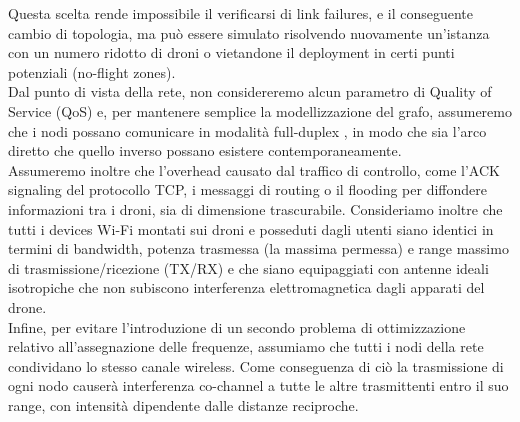 Questa scelta rende impossibile il verificarsi di link failures, e il conseguente cambio di topologia, ma può essere simulato risolvendo nuovamente un'istanza con un numero ridotto di droni o vietandone il deployment in certi punti potenziali (no-flight zones). \\
Dal punto di vista della rete, non considereremo alcun parametro di Quality of Service (QoS) \cite{6686488} e, per mantenere semplice la modellizzazione del grafo, assumeremo che i nodi possano comunicare in modalità full-duplex \cite{6262501}, in modo che sia l'arco diretto che quello inverso possano esistere contemporaneamente.  \\
Assumeremo inoltre che l'overhead causato dal traffico di controllo, come l'ACK signaling del protocollo TCP, i messaggi di routing o il flooding per diffondere informazioni tra i droni, sia di dimensione trascurabile. 
Consideriamo inoltre che tutti i devices Wi-Fi montati sui droni e posseduti dagli utenti siano identici in termini di bandwidth, potenza trasmessa (la massima permessa) e range massimo di trasmissione/ricezione (TX/RX) e che siano equipaggiati con antenne ideali isotropiche \cite{zennaro2004radio} che non subiscono interferenza elettromagnetica dagli apparati del drone. \\
Infine, per evitare l'introduzione di un secondo problema di ottimizzazione relativo all'assegnazione delle frequenze, assumiamo che tutti i nodi della rete condividano lo stesso canale wireless. 
Come conseguenza di ciò la trasmissione di ogni nodo causerà interferenza co-channel \cite{arokiamary2009cellular} a tutte le altre trasmittenti entro il suo range, con intensità dipendente dalle distanze reciproche.
 





